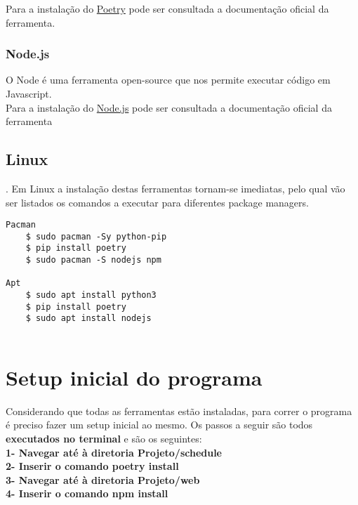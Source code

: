 \documentclass[11pt,a4paper]{report}
\begin{document}
Para a instalação do \href{https://python-poetry.org/docs/#installing-with-the-official-installer}{Poetry} pode ser consultada a documentação oficial da ferramenta.

 \subsection{Node.js}
 O Node é uma ferramenta open-source que nos permite executar código em Javascript.\\

 Para a instalação do \href{https://nodejs.org/en/download}{Node.js} pode ser consultada a documentação oficial da ferramenta
 
 \section{Linux}.
 Em Linux a instalação destas ferramentas tornam-se imediatas, pelo qual vão ser listados os comandos a executar para diferentes package managers.  \\

\begin{verbatim}
Pacman 
    $ sudo pacman -Sy python-pip
    $ pip install poetry 
    $ sudo pacman -S nodejs npm

Apt
    $ sudo apt install python3
    $ pip install poetry
    $ sudo apt install nodejs
 
\end{verbatim}



\chapter{Setup inicial do programa}
Considerando que todas as ferramentas estão instaladas, para correr o programa é preciso fazer um setup inicial ao mesmo. Os passos a seguir são todos \textbf{executados no terminal} e são os seguintes:  \\

\textbf{1- Navegar até à diretoria Projeto/schedule} \\

\textbf{2- Inserir o comando poetry install } \\

\textbf{3- Navegar até à diretoria Projeto/web} \\

\textbf{4- Inserir o comando npm install} \\
\end{document}
